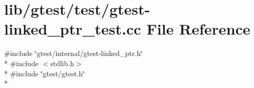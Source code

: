 \hypertarget{gtest-linked__ptr__test_8cc}{\section{lib/gtest/test/gtest-\/linked\-\_\-ptr\-\_\-test.cc File Reference}
\label{gtest-linked__ptr__test_8cc}
}
{\ttfamily \#include \char`\"{}gtest/internal/gtest-\/linked\-\_\-ptr.\-h\char`\"{}}\\*
{\ttfamily \#include $<$stdlib.\-h$>$}\\*
{\ttfamily \#include \char`\"{}gtest/gtest.\-h\char`\"{}}\\*
